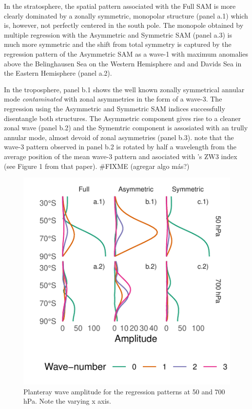\documentclass[]{ametsocV5}
\begin{document}
In the stratosphere, the spatial pattern associated with the Full SAM is
more clearly dominated by a zonally symmetric, monopolar structure
(panel a.1) which is, however, not perfectly centered in the south pole.
The monopole obtained by multiple regression with the Asymmetric and
Symmetric SAM (panel a.3) is much more symmetric and the shift from
total symmetry is captured by the regression pattern of the Asymmetric
SAM as a wave-1 with maximum anomalies above the Belinghausen Sea on the
Western Hemisphere and and Davids Sea in the Eastern Hemisphere (panel
a.2).

In the troposphere, panel b.1 shows the well known zonally symmetrical
annular mode \emph{contaminated} with zonal asymmetries in the form of a
wave-3. The regression using the Asymmetric and Symmetric SAM indices
successfully disentangle both structures. The Asymmetric component gives
rise to a cleaner zonal wave (panel b.2) and the Symemtric component is
assosiated with an trully annular mode, almost devoid of zonal
asymmetries (panel b.3). note that the wave-3 pattern observed in panel
b.2 is rotated by half a wavelength from the average position of the
mean wave-3 pattern and asociated with \citet{raphael2004}'s ZW3 index
(see Figure 1 from that paper). \#FIXME (agregar algo más?)

\begin{figure}
\includegraphics{wave-amplitude-1} \caption[Planteray wave amplitude for the regression patterns at 50 and 700 hPa]{Planteray wave amplitude for the regression patterns at 50 and 700 hPa. Note the varying x axis.}\label{fig:wave-amplitude}
\end{figure}
\end{document}
